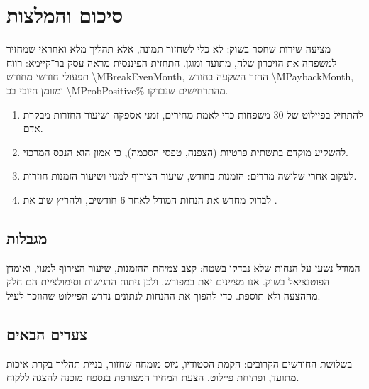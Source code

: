 \section{סיכום והמלצות }

 מציעה שירות שחסר בשוק: לא כלי לשחזור תמונה, אלא תהליך מלא ואחראי שמחזיר למשפחה את הזיכרון שלה, מתועד ומוגן. התחזית הפיננסית מראה עסק בר־קיימא: רווח תפעולי חודשי מחודש \num{\MBreakEvenMonth}, החזר השקעה בחודש \num{\MPaybackMonth}, ומזומן חיובי בכ-\num{\MProbPositive}\% מהתרחישים שנבדקו.

\begin{keybox}[title={המלצות}]
\begin{enumerate}[leftmargin=*,itemsep=2pt]
  \item להתחיל בפיילוט של \num{30} משפחות כדי לאמת מחירים, זמני אספקה ושיעור החזרות מבקרת אדם.
  \item להשקיע מוקדם בתשתית פרטיות (הצפנה, טפסי הסכמה), כי אמון הוא הנכס המרכזי.
  \item לעקוב אחרי שלושה מדדים: הזמנות בחודש, שיעור הצירוף למנוי ושיעור הזמנות חוזרות.
  \item לבדוק מחדש את הנחות המודל לאחר \num{6} חודשים, ולהריץ שוב את .
\end{enumerate}
\end{keybox}

\subsection{מגבלות}
המודל נשען על הנחות שלא נבדקו בשטח: קצב צמיחת ההזמנות, שיעור הצירוף למנוי, ואומדן הפוטנציאל בשוק. אנו מציינים זאת במפורש, ולכן ניתוח הרגישות וסימולציית  הם חלק מההצעה ולא תוספת. כדי להפוך את ההנחות לנתונים נדרש הפיילוט שהוזכר לעיל.

\subsection{צעדים הבאים}
בשלושת החודשים הקרובים: הקמת הסטודיו, גיוס מומחה שחזור, בניית תהליך בקרת איכות מתועד, ופתיחת פיילוט. הצעת המחיר המצורפת בנספח מוכנה להצגה ללקוח.
